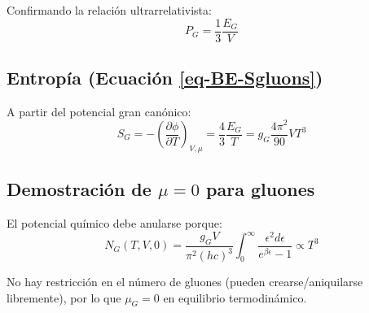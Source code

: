 Confirmando la relación ultrarrelativista:
\begin{equation}
P_G = \frac{1}{3} \frac{E_G}{V}
\end{equation}

\subsection{Entropía (Ecuación \ref{eq-BE-Sgluons})}
A partir del potencial gran canónico:
\begin{equation}
S_G = -\left( \frac{\partial \phi}{\partial T} \right)_{V,\mu} = \frac{4}{3} \frac{E_G}{T} = g_G \frac{4\pi^2}{90} V T^3
\end{equation}

\subsection{Demostración de $\mu = 0$ para gluones}
El potencial químico debe anularse porque:
\begin{equation}
N_G(T,V,0) = \frac{g_G V}{\pi^2 (hc)^3} \int_0^\infty \frac{\epsilon^2 d\epsilon}{e^{\beta\epsilon} - 1} \propto T^3
\end{equation}

No hay restricción en el número de gluones (pueden crearse/aniquilarse libremente), por lo que $\mu_G = 0$ en equilibrio termodinámico.






